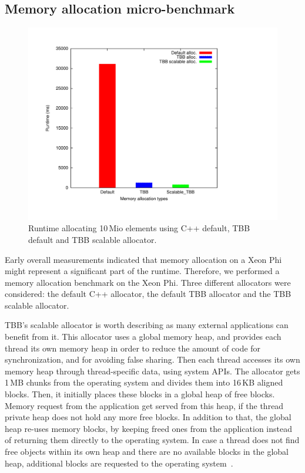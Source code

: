 \subsection{Memory allocation micro-benchmark}
\begin{figure}[t]
	\centering
	\includegraphics[scale=0.3]{../plots/mem_alloc/mem_alloc.pdf}
	\caption{Runtime allocating 10\,Mio elements using C++ default, TBB default and TBB scalable allocator.}
	\label{fig:mem_alloc}
\end{figure}

Early overall measurements indicated that memory allocation on a Xeon Phi might represent a significant part of the runtime.
Therefore, we performed a memory allocation benchmark on the Xeon Phi.
Three different allocators were considered: the default C++ allocator, the default TBB allocator and the TBB scalable allocator. 

TBB's scalable allocator is worth describing as many external applications can benefit from it.
This allocator uses a global memory heap, and provides each thread its own memory heap in order to reduce the amount of code for synchronization, and for avoiding false sharing. Then each thread accesses its own memory heap through thread-specific data, using system APIs. The allocator gets 1\,MB chunks from the operating system and divides them into 16\,KB aligned blocks. Then, it initially places these blocks in a global heap of free blocks. Memory request from the application get served from this heap, if the thread private heap does not hold any more free blocks.
In addition to that, the global heap re-uses memory blocks, by keeping freed ones from the application instead of returning them directly to the operating system.
In case a thread does not find free objects within its own heap and there are no available blocks in the global heap, additional blocks are requested to the operating system~\cite{_thefoundations,Hudson:2006:MST:1133956.1133967}. 

